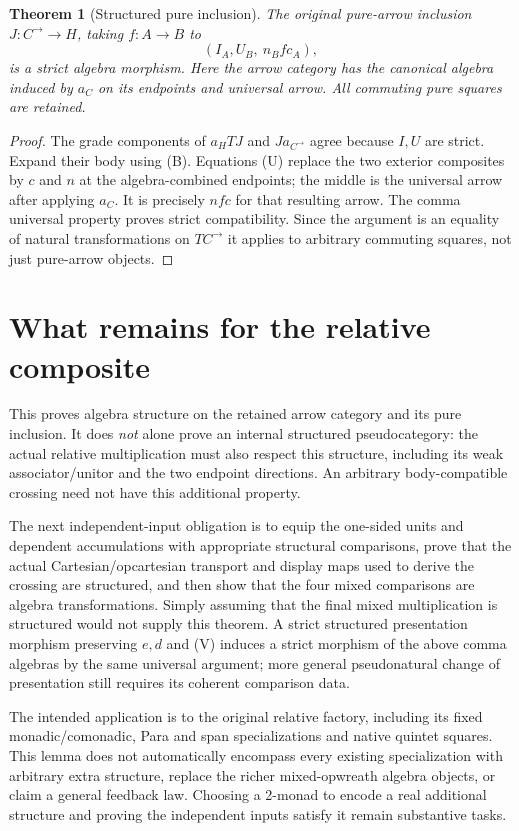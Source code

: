 \documentclass[11pt]{article}
\newtheorem{theorem}{Theorem}\newtheorem{lemma}{Lemma}
\begin{document}
\begin{theorem}[Structured pure inclusion]
The original pure-arrow inclusion $J:C^{\to}\to H$, taking $f:A\to B$ to
\[
 (I_A,U_B,\ n_B f c_A),
\]
is a strict algebra morphism. Here the arrow category has the canonical algebra induced by $a_C$ on its endpoints and universal arrow. All commuting pure squares are retained.
\end{theorem}
\begin{proof}
The grade components of $a_HTJ$ and $Ja_{C^{\to}}$ agree because $I,U$ are strict. Expand their body using (B). Equations (U) replace the two exterior composites by $c$ and $n$ at the algebra-combined endpoints; the middle is the universal arrow after applying $a_C$. It is precisely $n f c$ for that resulting arrow. The comma universal property proves strict compatibility. Since the argument is an equality of natural transformations on $TC^{\to}$ it applies to arbitrary commuting squares, not just pure-arrow objects.
\end{proof}

\section{What remains for the relative composite}
This proves algebra structure on the retained arrow category and its pure inclusion. It does \emph{not} alone prove an internal structured pseudocategory: the actual relative multiplication must also respect this structure, including its weak associator/unitor and the two endpoint directions. An arbitrary body-compatible crossing need not have this additional property.

The next independent-input obligation is to equip the one-sided units and dependent accumulations with appropriate structural comparisons, prove that the actual Cartesian/opcartesian transport and display maps used to derive the crossing are structured, and then show that the four mixed comparisons are algebra transformations. Simply assuming that the final mixed multiplication is structured would not supply this theorem. A strict structured presentation morphism preserving $e,d$ and (V) induces a strict morphism of the above comma algebras by the same universal argument; more general pseudonatural change of presentation still requires its coherent comparison data.

The intended application is to the original relative factory, including its fixed monadic/comonadic, Para and span specializations and native quintet squares. This lemma does not automatically encompass every existing specialization with arbitrary extra structure, replace the richer mixed-opwreath algebra objects, or claim a general feedback law. Choosing a 2-monad to encode a real additional structure and proving the independent inputs satisfy it remain substantive tasks.
\end{document}
